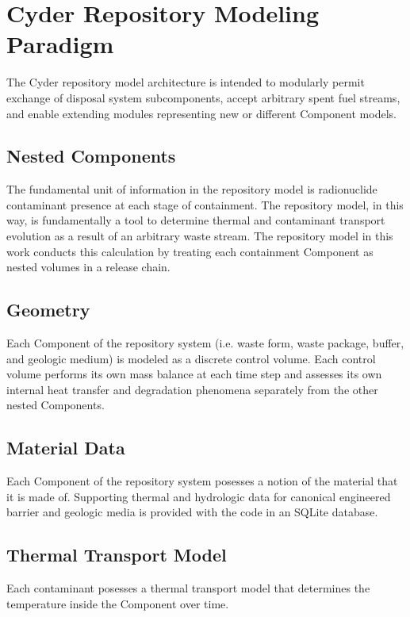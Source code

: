 \section{Cyder Repository Modeling Paradigm}

The Cyder repository model architecture is intended to modularly permit 
exchange of disposal system subcomponents, accept arbitrary spent fuel 
streams, and enable extending modules representing new or different 
Component models.

\subsection{Nested Components}

The fundamental unit of information in the repository model is radionuclide 
contaminant presence at each stage of containment.  The repository model, in 
this way, is fundamentally a tool to determine thermal and contaminant 
transport evolution as a result of an arbitrary waste stream. The repository 
model in this work conducts this calculation by  treating each containment 
Component as nested volumes in a release chain. 

\subsection{Geometry}

Each Component of the repository system (i.e. waste form, waste package, buffer, 
and geologic medium) is modeled as a discrete control volume. Each control 
volume performs its own mass balance at each time step and assesses its own 
internal  heat transfer and degradation phenomena separately from the other 
nested Components.

\subsection{Material Data}

Each Component of the repository system posesses a notion of the material that 
it is made of. Supporting thermal and hydrologic data for canonical engineered 
barrier and geologic media is provided with the code in an SQLite database. 

\subsection{Thermal Transport Model}

Each contaminant posesses a thermal transport model that determines the 
temperature inside the Component over time. 

